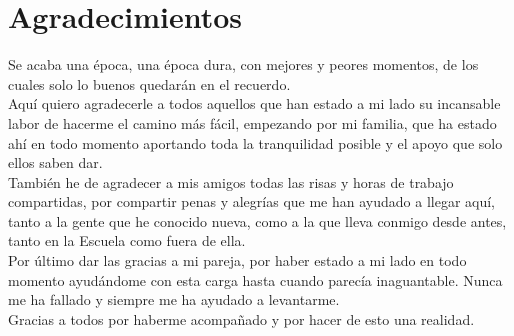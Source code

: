 \thispagestyle{empty}

\chapter*{Agradecimientos}

Se acaba una época, una época dura, con mejores y peores momentos, de los cuales solo lo buenos quedarán en el recuerdo.\\

Aquí quiero agradecerle a todos aquellos que han estado a mi lado su incansable labor de hacerme el camino más fácil, empezando por mi familia, que ha estado ahí en todo momento aportando toda la tranquilidad posible y el apoyo que solo ellos saben dar.\\

También he de agradecer a mis amigos todas las risas y horas de trabajo compartidas, por compartir penas y alegrías que me han ayudado a llegar aquí, tanto a la gente que he conocido nueva, como a la que lleva conmigo desde antes, tanto en la Escuela como fuera de ella.\\

Por último dar las gracias a mi pareja, por haber estado a mi lado en todo momento ayudándome con esta carga hasta cuando parecía inaguantable. Nunca me ha fallado y siempre me ha ayudado a levantarme.\\

Gracias a todos por haberme acompañado y por hacer de esto una realidad.
